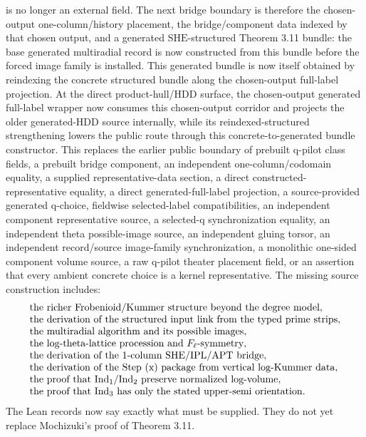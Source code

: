 \documentclass[11pt]{article}
\newcommand{\IndOne}{\ensuremath{\mathrm{Ind}_1}}
\newcommand{\IndTwo}{\ensuremath{\mathrm{Ind}_2}}
\newcommand{\IndThree}{\ensuremath{\mathrm{Ind}_3}}
\newcommand{\SHE}{\ensuremath{\mathrm{SHE}}}
\newcommand{\IPL}{\ensuremath{\mathrm{IPL}}}
\newcommand{\APT}{\ensuremath{\mathrm{APT}}}
\theoremstyle{plain}
\theoremstyle{definition}
\theoremstyle{remark}
\begin{document}
is no longer an external field.  The next bridge boundary is therefore the
chosen-output one-column/history placement, the bridge/component data indexed
by that chosen output, and a generated \(\SHE\)-structured Theorem 3.11 bundle:
the base generated multiradial record is now constructed from this bundle before
the forced image family is installed.  This generated bundle is now itself
obtained by reindexing the concrete structured bundle along the chosen-output
full-label projection.  At the direct product-hull/HDD surface, the
chosen-output generated full-label wrapper now consumes this chosen-output
corridor and projects the older generated-HDD source internally, while its
reindexed-structured strengthening lowers the public route through this
concrete-to-generated bundle constructor.
This replaces the earlier public boundary of
prebuilt q-pilot class fields, a prebuilt bridge
component, an independent one-column/codomain equality, a supplied
representative-data section, a direct constructed-representative equality, a
direct generated-full-label projection, a source-provided generated q-choice,
fieldwise selected-label compatibilities, an independent component
representative source, a selected-q synchronization equality, an independent
theta possible-image source, an independent gluing torsor, an independent
record/source image-family synchronization, a monolithic one-sided component
volume source, a raw q-pilot theater placement field, or an assertion that
every ambient concrete choice is a kernel representative.
The
missing source construction includes:
\[
\begin{array}{l}
\text{the richer Frobenioid/Kummer structure beyond the degree model},\\
\text{the derivation of the structured input link from the typed prime strips},\\
\text{the multiradial algorithm and its possible images},\\
\text{the log-theta-lattice procession and \(F_\ell\)-symmetry},\\
\text{the derivation of the \(1\)-column \(\SHE/\IPL/\APT\) bridge},\\
\text{the derivation of the Step (x) package from vertical log-Kummer data},\\
\text{the proof that \IndOne/\IndTwo{} preserve normalized log-volume},\\
\text{the proof that \IndThree{} has only the stated upper-semi orientation}.
\end{array}
\]
The Lean records now say exactly what must be supplied.  They do not yet
replace Mochizuki's proof of Theorem 3.11.
\end{document}
